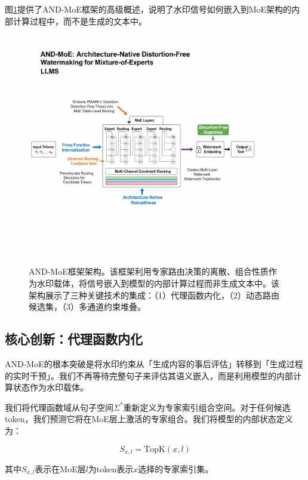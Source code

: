 \documentclass[letterpaper,twocolumn,10pt]{article}
\begin{document}
图\ref{fig:architecture}提供了AND-MoE框架的高级概述，说明了水印信号如何嵌入到MoE架构的内部计算过程中，而不是生成的文本中。

\begin{figure}[t]
\centering
\includegraphics[width=0.9\textwidth]{figs/AND-MoE-Arch.png}
\caption{AND-MoE框架架构。该框架利用专家路由决策的离散、组合性质作为水印载体，将信号嵌入到模型的内部计算过程而非生成文本中。该架构展示了三种关键技术的集成：（1）代理函数内化，（2）动态路由候选集，（3）多通道约束堆叠。}
\label{fig:architecture}
\end{figure}

\subsection{核心创新：代理函数内化}

AND-MoE的根本突破是将水印约束从「生成内容的事后评估」转移到「生成过程的实时干预」。我们不再等待完整句子来评估其语义嵌入，而是利用模型的内部计算状态作为水印载体。

我们将代理函数域从句子空间$\Sigma^*$重新定义为专家索引组合空间。对于任何候选token，我们预测它将在MoE层上激活的专家组合。我们将模型的内部状态定义为：

\begin{equation}
S_{x,l} = \text{TopK}(x, l)
\end{equation}

其中$S_{x,l}$表示在MoE层$l$为token表示$x$选择的专家索引集。
\end{document}
